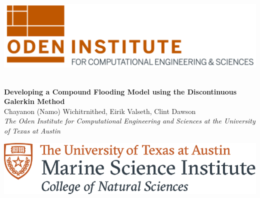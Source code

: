 \documentclass[american]{article}
\title{}
\author{}
\date{}
\begin{document}

\begin{center}
  \begin{minipage}{.16\linewidth}
  \qquad\qquad
    \includegraphics[width=\linewidth]{media/images/oden-logo-2019.png}
    ~\vfill
    ~\vfill
  \end{minipage}
  \begin{minipage}{.6\linewidth}
    \begin{center}
       \textsf{\textbf{{\fontsize{90}{108}\selectfont  Developing a Compound Flooding Model using the Discontinuous Galerkin Method}}}\\\vspace{1cm}
       \textrm{\fontsize{40}{48}\selectfont Chayanon (Namo) Wichitrnithed, Eirik Valseth, Clint Dawson \\\vspace{5mm} \textit{The Oden Institute for Computational Engineering and Sciences at the University of Texas at Austin} \vspace{5mm} }
    \end{center}
  \end{minipage}
  \hspace{.03\linewidth}
    \begin{minipage}{.16\linewidth}
  \qquad\qquad
    \includegraphics[width=\linewidth]{media/images/msi_logo.png}
    ~\vfill
    ~\vfill
  \end{minipage}
\end{center}

\end{document}
